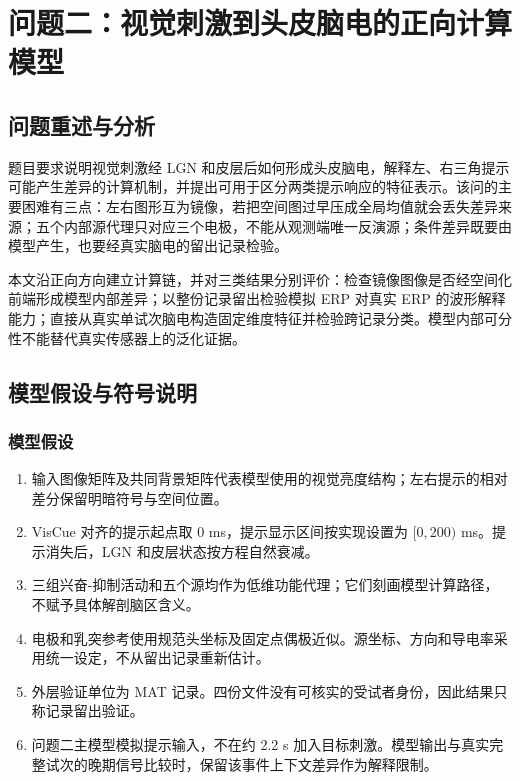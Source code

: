 \section{问题二：视觉刺激到头皮脑电的正向计算模型}

\subsection{问题重述与分析}

题目要求说明视觉刺激经 LGN 和皮层后如何形成头皮脑电，解释左、右三角提示可能产生差异的计算机制，并提出可用于区分两类提示响应的特征表示\cite{problem2026}。该问的主要困难有三点：左右图形互为镜像，若把空间图过早压成全局均值就会丢失差异来源；五个内部源代理只对应三个电极，不能从观测端唯一反演源；条件差异既要由模型产生，也要经真实脑电的留出记录检验。

本文沿正向方向建立计算链，并对三类结果分别评价：检查镜像图像是否经空间化前端形成模型内部差异；以整份记录留出检验模拟 ERP 对真实 ERP 的波形解释能力；直接从真实单试次脑电构造固定维度特征并检验跨记录分类。模型内部可分性不能替代真实传感器上的泛化证据。

\subsection{模型假设与符号说明}

\subsubsection{模型假设}

\begin{enumerate}
\def\labelenumi{\arabic{enumi}.}
\tightlist
\item 输入图像矩阵及共同背景矩阵代表模型使用的视觉亮度结构；左右提示的相对差分保留明暗符号与空间位置。
\item VisCue 对齐的提示起点取 0 ms，提示显示区间按实现设置为 \([0,200)\) ms。提示消失后，LGN 和皮层状态按方程自然衰减。
\item 三组兴奋-抑制活动和五个源均作为低维功能代理；它们刻画模型计算路径，不赋予具体解剖脑区含义。
\item 电极和乳突参考使用规范头坐标及固定点偶极近似。源坐标、方向和导电率采用统一设定，不从留出记录重新估计。
\item 外层验证单位为 MAT 记录。四份文件没有可核实的受试者身份，因此结果只称记录留出验证。
\item 问题二主模型模拟提示输入，不在约 2.2 s 加入目标刺激。模型输出与真实完整试次的晚期信号比较时，保留该事件上下文差异作为解释限制。
\end{enumerate}

